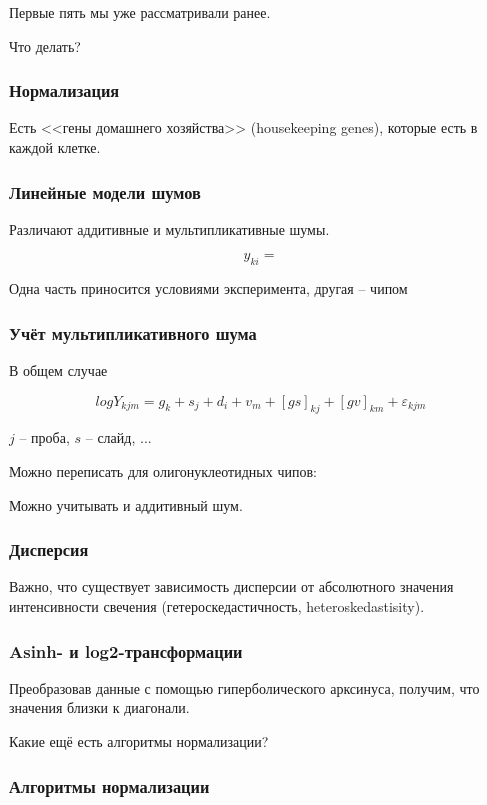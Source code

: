 \documentclass[main.tex]{subfiles}
\begin{document}
Первые пять мы уже рассматривали ранее.

Что делать?

\subsubsection{Нормализация}
Есть <<гены домашнего хозяйства>> (housekeeping genes), которые есть в каждой клетке.


\subsubsection{Линейные модели шумов}
Различают аддитивные и мультипликативные шумы.

$$ y_{ki} = $$ %

Одна часть приносится условиями эксперимента, другая -- чипом

\subsubsection{Учёт мультипликативного шума}

В общем случае

$$ log Y_{kjm} = g_k + s_j + d_i + v_m + [gs]_{kj} + [gv]_{km} + \varepsilon_{kjm} $$

$ j $ -- проба, $ s $ -- слайд, ... %

Можно переписать для олигонуклеотидных чипов: %

Можно учитывать и аддитивный шум.

\subsubsection{Дисперсия}
Важно, что существует зависимость дисперсии от абсолютного значения интенсивности свечения (гетероскедастичность, heteroskedastisity). %

\subsubsection{Asinh- и log2-трансформации}
Преобразовав данные с помощью гиперболического арксинуса, получим, что значения близки к диагонали. %

Какие ещё есть алгоритмы нормализации?
\subsubsection{Алгоритмы нормализации} %
\end{document}
